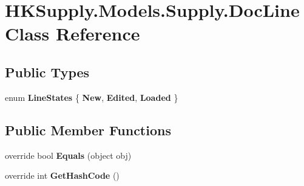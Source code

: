 \hypertarget{class_h_k_supply_1_1_models_1_1_supply_1_1_doc_line}{}\section{H\+K\+Supply.\+Models.\+Supply.\+Doc\+Line Class Reference}
\label{class_h_k_supply_1_1_models_1_1_supply_1_1_doc_line}
\subsection*{Public Types}
\begin{DoxyCompactItemize}
\item 
\mbox{\label{class_h_k_supply_1_1_models_1_1_supply_1_1_doc_line_a68b8c2956cea864916ae9bcba560c3da}} 
enum {\bfseries Line\+States} \{ {\bfseries New}, 
{\bfseries Edited}, 
{\bfseries Loaded}
 \}
\end{DoxyCompactItemize}
\subsection*{Public Member Functions}
\begin{DoxyCompactItemize}
\item 
\mbox{\label{class_h_k_supply_1_1_models_1_1_supply_1_1_doc_line_a5a8c95da2c1486d7f75ab44a2c1b7771}} 
override bool {\bfseries Equals} (object obj)
\item 
\mbox{\label{class_h_k_supply_1_1_models_1_1_supply_1_1_doc_line_a56c0291300e2c7b0c25782f94f6d7b29}} 
override int {\bfseries Get\+Hash\+Code} ()
\end{DoxyCompactItemize}
